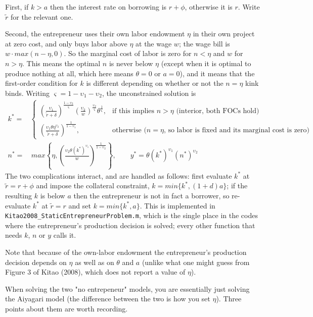\documentclass[11pt,fleqn]{article}
\begin{document}
First, if $k>a$ then the interest rate on borrowing is $r+\phi$, otherwise it is $r$. Write $\tilde{r}$ for the relevant one.

Second, the entrepreneur uses their own labor endowment $\eta$ in their own project at zero cost, and only buys labor above $\eta$ at the wage $w$; the wage bill is $w \cdot max(n-\eta,0)$. So the marginal cost of labor is zero for $n<\eta$ and $w$ for $n>\eta$. This means the optimal $n$ is never below $\eta$ (except when it is optimal to produce nothing at all, which here means $\theta=0$ or $a=0$), and it means that the first-order condition for $k$ is different depending on whether or not the $n=\eta$ kink binds. Writing $\varsigma=1-\upsilon_1-\upsilon_2$, the unconstrained solution is
\begin{align*}
 k^{*} = & \begin{cases}
   \left(\frac{\upsilon_1}{\tilde{r}+\delta}\right)^{\frac{1-\upsilon_2}{\varsigma}} \left(\frac{\upsilon_2}{w}\right)^{\frac{\upsilon_2}{\varsigma}} \theta^{\frac{1}{\varsigma}}, & \text{if this implies } n>\eta \text{ (interior, both FOCs hold)} \\
   \left(\frac{\upsilon_1 \theta \eta^{\upsilon_2}}{\tilde{r}+\delta}\right)^{\frac{1}{1-\upsilon_1}}, & \text{otherwise (}n=\eta\text{, so labor is fixed and its marginal cost is zero)}
  \end{cases} \\
 n^{*} = & \, max\left\{ \eta, \left(\frac{\upsilon_2 \theta (k^{*})^{\upsilon_1}}{w}\right)^{\frac{1}{1-\upsilon_2}} \right\}, \qquad y^{*}=\theta (k^{*})^{\upsilon_1} (n^{*})^{\upsilon_2}
\end{align*}
The two complications interact, and are handled as follows: first evaluate $k^{*}$ at $\tilde{r}=r+\phi$ and impose the collateral constraint, $k=min\{k^{*},(1+d)a\}$; if the resulting $k$ is below $a$ then the entrepreneur is not in fact a borrower, so re-evaluate $k^{*}$ at $\tilde{r}=r$ and set $k=min\{k^{*},a\}$. This is implemented in \texttt{Kitao2008\_StaticEntrepreneurProblem.m}, which is the single place in the codes where the entrepreneur's production decision is solved; every other function that needs $k$, $n$ or $y$ calls it.

Note that because of the own-labor endowment the entrepreneur's production decision depends on $\eta$ as well as on $\theta$ and $a$ (unlike what one might guess from Figure 3 of Kitao (2008), which does not report a value of $\eta$).

When solving the two "no entrepeneur" models, you are essentially just solving the Aiyagari model (the difference between the two is how you set $\eta$). Three points about them are worth recording.
\end{document}
